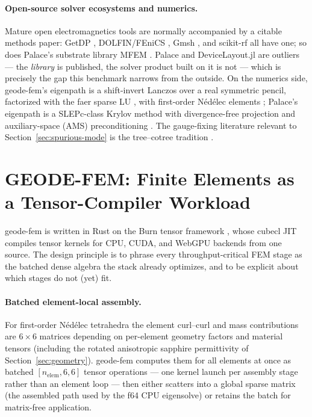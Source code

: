 \documentclass{anvil-paper}
\begin{document}
\paragraph{Open-source solver ecosystems and numerics.}
Mature open electromagnetics tools are normally accompanied by a citable
methods paper: GetDP \citep{dular1998general}, DOLFIN/FEniCS
\citep{logg2010dolfin}, Gmsh \citep{gmsh}, and scikit-rf
\citep{arsenovic2022scikit} all have one; so does Palace's substrate
library MFEM \citep{mfem,andrej2024high}. Palace and DeviceLayout.jl are
outliers --- the \emph{library} is published, the solver product built on
it is not --- which is precisely the gap this benchmark narrows from the
outside. On the numerics side, geode-fem's eigenpath is a shift-invert
Lanczos \citep{arpack} over a real symmetric pencil, factorized with the
faer sparse LU \citep{kazdadi2026faer}, with first-order N\'ed\'elec
elements \citep{nedelec1980}; Palace's eigenpath is a SLEPc-class Krylov
method \citep{slepc} with divergence-free projection and auxiliary-space
(AMS) preconditioning
\citep{hiptmair-xu,tzaniovkolevpanayotsvassilevski2018parallel}. The
gauge-fixing literature relevant to Section~\ref{sec:spurious-mode} is the
tree--cotree tradition \citep{albanese1988solution,manges1995generalized}.

\section{GEODE-FEM: Finite Elements as a Tensor-Compiler Workload}
\label{sec:architecture}

geode-fem is written in Rust on the Burn tensor framework \citep{burn},
whose cubecl JIT compiles tensor kernels for CPU, CUDA, and WebGPU
backends from one source. The design principle is to phrase every
throughput-critical FEM stage as the batched dense algebra the stack
already optimizes, and to be explicit about which stages do not (yet) fit.

\paragraph{Batched element-local assembly.}
For first-order N\'ed\'elec tetrahedra the element curl--curl and mass
contributions are $6\times 6$ matrices depending on per-element geometry
factors and material tensors (including the rotated anisotropic sapphire
permittivity of Section~\ref{sec:geometry}). geode-fem computes them for
all elements at once as batched $[n_{\mathrm{elem}},6,6]$ tensor
operations --- one kernel launch per assembly stage rather than an
element loop --- then either scatters into a global sparse matrix (the
assembled path used by the f64 CPU eigensolve) or retains the batch for
matrix-free application.
\end{document}
